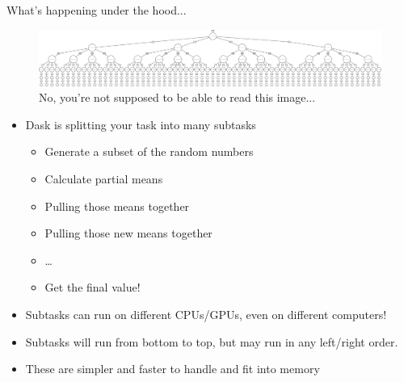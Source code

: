 \documentclass[9pt, aspectratio=169]{beamer}
\begin{document}
\begin{frame}{What's happening under the hood...}
	\begin{figure}
		\includegraphics[width=\textwidth]{biggraph.png}
		\caption{No, you're not supposed to be able to read this image...}
	\end{figure}
	\pause
	\begin{itemize}
		\item Dask is splitting your task into many subtasks
		      \begin{itemize}
			      \item Generate a subset of the random numbers
			      \item Calculate partial means
			      \item Pulling those means together
			      \item Pulling those new means together
			      \item \dots
			      \item Get the final value!
		      \end{itemize}
		      \pause
		\item Subtasks can run on different CPUs/GPUs, even on different computers!
		\item Subtasks will run from bottom to top, but may run in any left/right order.
		\item These are simpler and faster to handle and fit into memory
	\end{itemize}
\end{frame}
\end{document}

